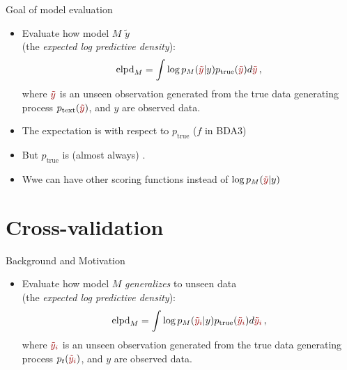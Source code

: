 \documentclass[10pt]{beamer}
\begin{document}
\begin{frame}{Goal of model evaluation}

\begin{itemize}
\item Evaluate how model $M$  $\tilde{y}$\\(the \emph{expected log predictive density}):
\[
\text{elpd}_M= \int \log p_M({\color{uured}\tilde{y}}|y) p_\text{true}({\color{uured}\tilde{y}}) d{\color{uured}\tilde{y}}\,,
\]
where ${\color{uured}\tilde{y}}$ is an unseen observation generated from the true data generating process $p_\text{text}({\color{uured}\tilde{y}})$, and $y$ are observed data.
\item The expectation is with respect to $p_\text{true}$ ($f$ in BDA3)
\item But $p_\text{true}$ is (almost always) .
\item Wwe can have other scoring functions instead of $\log p_M({\color{uured}\tilde{y}}|y)$
\end{itemize}
\end{frame}




\section{Cross-validation}
\frame{\sectionpage}

\begin{frame}{Background and Motivation}
\begin{itemize}
\item Evaluate how model $M$ \emph{generalizes} to unseen data \\(the \emph{expected log predictive density}):
\[
\text{elpd}_M= \int \log p_M({\color{uured}\tilde{y}_i}|y) p_\text{true}({\color{uured}\tilde{y}_i}) d{\color{uured}\tilde{y}_i}\,,
\]
where ${\color{uured}\tilde{y}_i}$ is an unseen observation generated from the true data generating process $p_t({\color{uured}\tilde{y}_i})$, and $y$ are observed data.
\end{itemize}
\end{frame}
\end{document}
